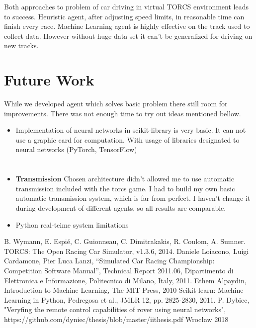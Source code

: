 \documentclass[declaration,shortabstract,english,inz]{iithesis}
\begin{document}
Both approaches to problem of car driving in virtual TORCS environment leads to success.
Heuristic agent, after adjusting speed limits, in reasonable time can finish every race. Machine Learning agent is highly effective on the track used to collect data.
However without huge data set it can't be generalized for driving on new tracks. 

\section{Future Work}

While we developed agent which solves basic problem there still room for improvements. There was not enough time to try out ideas mentioned bellow.
\begin{itemize}
    \item Implementation of neural networks in scikit-library is very basic. It can not use a graphic card for computation. With usage of libraries designated to neural networks (PyTorch, TensorFlow)  
\end{itemize}



\section{}
\begin{itemize}
    \item \textbf{Transmission} Chosen architecture didn't allowed me to use automatic transmission included with the torcs game. I had to build my own basic automatic transmission system, which is far from perfect. I haven't change it during development of different agents, so all results are comparable. 
    \item Python real-teime system limitations
\end{itemize}



\begin{thebibliography}{1}
 B. Wymann, E. Espié, C. Guionneau, C. Dimitrakakis, R. Coulom, A. Sumner. TORCS: The Open Racing Car Simulator, v1.3.6, 2014.
 Daniele Loiacono, Luigi Cardamone, Pier Luca Lanzi, “Simulated Car
Racing Championship: Competition Software Manual”, Technical Report 2011.06, Dipartimento
di Elettronica e Informazione, Politecnico di Milano, Italy, 2011.
 Ethem Alpaydin, Introduction to Machine Learning, The MIT Press, 2010
 Scikit-learn: Machine Learning in Python, Pedregosa et al., JMLR 12, pp. 2825-2830, 2011.
 P. Dybiec, "Veryfing the remote control capabilities of rover using neural networks", https://github.com/dyniec/thesis/blob/master/iithesis.pdf Wrocław 2018

\end{thebibliography}
\end{document}
